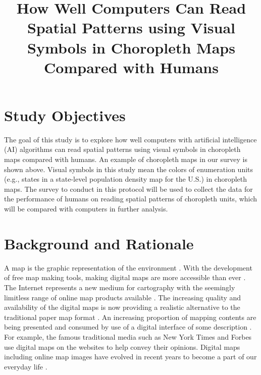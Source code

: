 


\title{How Well Computers Can Read Spatial Patterns using Visual Symbols in Choropleth Maps Compared with Humans}


\iraggedright
\maketitle

\section{Study Objectives}
The goal of this study is to explore how well computers with artificial intelligence (AI) algorithms can read spatial patterns using visual symbols in choropleth maps compared with humans. An example of choropleth maps in our survey is shown above. Visual symbols in this study mean the colors of enumeration units (e.g., states in a state-level population density map for the U.S.) in choropleth maps. The survey to conduct in this protocol will be used to collect the data for the performance of humans on reading spatial patterns of choropleth units, which will be compared with computers in further analysis.

\section{Background and Rationale}
A map is the graphic representation of the environment \citep{robinson1995elements}. With the development of free map making tools, making digital maps are more accessible than ever \citep{Robinson2019}. The Internet represents a new medium for cartography with the seemingly limitless range of online map products available \citep{peterson2005maps}. The increasing quality and availability of the digital maps is now providing a realistic alternative to the traditional paper map format \citep{Hurst2013}. An increasing proportion of mapping contents are being presented and consumed by use of a digital interface of some description \citep{dodge2011mapping}. For example, the famous traditional media such as New York Times and Forbes use digital maps on the websites to help convey their opinions. Digital maps including online map images have evolved in recent years to become a part of our everyday life \citep{Aly2017}. 

